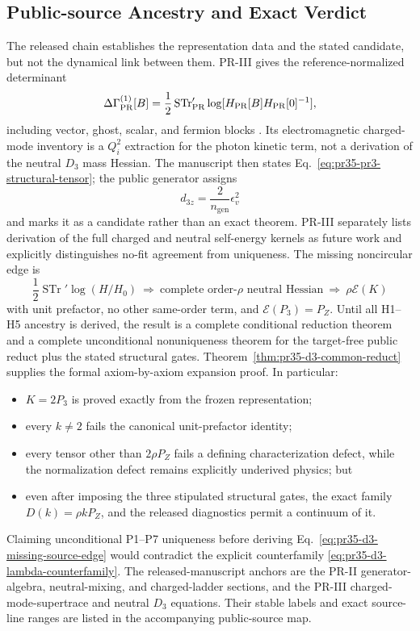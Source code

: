 \subsection{Public-source Ancestry and Exact Verdict}

The released chain establishes the representation data and the stated
candidate, but not the dynamical link between them.  PR-III gives the
reference-normalized determinant
\begin{equation}
 \Delta\Gamma_{\rm PR}^{(1)}[B]
 =\frac12\operatorname{STr}_{\rm PR}'
 \log[H_{\rm PR}[B]H_{\rm PR}[0]^{-1}],
\end{equation}
including vector, ghost, scalar, and fermion blocks \cite{PeskinSchroeder_1995, PRIII}.  Its electromagnetic charged-mode inventory is a $Q_i^2$ extraction for the photon kinetic term, not a derivation of the neutral $D_3$ mass Hessian.  The manuscript then states Eq.~\ref{eq:pr35-pr3-structural-tensor}; the public generator assigns
\begin{equation}
 d_{3z} = \frac{2}{n_{\text{gen}}} \epsilon_v^2
\end{equation}
and marks it as a candidate rather than an exact theorem.  PR-III separately
lists derivation of the full charged and neutral self-energy kernels as future
work and explicitly distinguishes no-fit agreement from uniqueness. The missing noncircular edge is
\begin{equation}
 \frac12\operatorname{STr}'\log(H/H_0)
 \ \Longrightarrow\ \text{complete order-}\rho\text{ neutral Hessian}
 \ \Longrightarrow\ \rho\mathcal E(K)
 \label{eq:pr35-d3-missing-source-edge}
\end{equation}
with unit prefactor, no other same-order term, and
$\mathcal E(P_3)=P_Z$.  Until all H1--H5 ancestry is derived, the result is a
complete conditional reduction theorem and a complete unconditional
nonuniqueness theorem for the target-free public reduct plus the stated
structural gates.  Theorem~\ref{thm:pr35-d3-common-reduct} supplies the formal
axiom-by-axiom expansion proof.  In particular:
\begin{itemize}
 \item $K=2P_3$ is proved exactly from the frozen representation;
 \item every $k\ne2$ fails the canonical unit-prefactor identity;
 \item every tensor other than $2\rho P_Z$ fails a defining characterization
 defect, while the normalization defect remains explicitly underived physics;
 but
 \item even after imposing the three stipulated structural gates, the exact family
 $D(k)=\rho kP_Z$, and the released diagnostics permit a continuum of it.
\end{itemize}
Claiming unconditional P1--P7 uniqueness before deriving Eq.~\eqref{eq:pr35-d3-missing-source-edge} would contradict the explicit counterfamily \eqref{eq:pr35-d3-lambda-counterfamily}. The released-manuscript anchors are the PR-II generator-algebra, neutral-mixing, and charged-ladder sections, and the PR-III charged-mode-supertrace and neutral $D_3$ equations.  Their stable labels and exact source-line ranges are listed in the accompanying public-source map.

